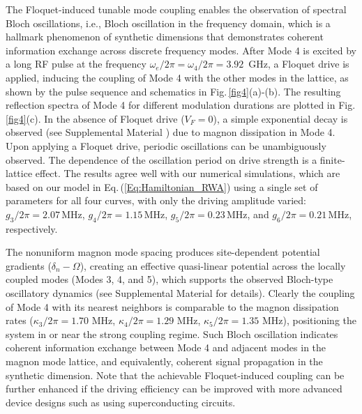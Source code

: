 \documentclass[
twocolumn,

superscriptaddress,









 amsmath,amssymb,
 aps,


prl,




]{revtex4-2}
\begin{document}
The Floquet-induced tunable mode coupling enables the observation of spectral Bloch oscillations, i.e., Bloch oscillation in the frequency domain, which is a hallmark phenomenon of synthetic dimensions that demonstrates coherent information exchange across discrete frequency modes. After Mode 4 is excited by a long RF pulse at the frequency $\omega_e/2\pi=\omega_4/2\pi=3.92$~GHz, a Floquet drive is applied, inducing the coupling of Mode 4 with the other modes in the lattice, as shown by the pulse sequence and schematics in Fig.\,\ref{fig4}(a)-(b). The resulting reflection spectra of Mode 4 for different modulation durations are plotted in Fig.\,\ref{fig4}(c). In the absence of Floquet drive ($V_F = 0$), a simple exponential decay is observed (see Supplemental Material \cite{SM}) due to magnon dissipation in Mode 4. Upon applying a Floquet drive, periodic oscillations can be unambiguously observed. The dependence of the oscillation period on drive strength is a finite-lattice effect. The results agree well with our numerical simulations, which are based on our model in Eq.\,(\ref{Eq:Hamiltonian_RWA}) using a single set of parameters for all four curves, with only the driving amplitude varied: $g_3/2\pi = 2.07$\,MHz, $g_4/2\pi = 1.15$\,MHz, $g_5/2\pi = 0.23$\,MHz, and $g_6/2\pi = 0.21$\,MHz, respectively.

The nonuniform magnon mode spacing produces site-dependent potential gradients ($\delta_n - \Omega$), creating an effective quasi-linear potential across the locally coupled modes (Modes 3, 4, and 5), which supports the observed Bloch-type oscillatory dynamics (see Supplemental Material \cite{SM} for details). Clearly the coupling of Mode 4 with its nearest neighbors is comparable to the magnon dissipation rates ($\kappa_3/2\pi=1.70$ MHz, $\kappa_4/2\pi=1.29$ MHz, $\kappa_5/2\pi=1.35$ MHz), positioning the system in or near the strong coupling regime. Such Bloch oscillation indicates coherent information exchange between Mode 4 and adjacent modes in the magnon mode lattice, and equivalently, coherent signal propagation in the synthetic dimension. Note that the achievable Floquet-induced coupling can be further enhanced if the driving efficiency can be improved with more advanced device designs such as using superconducting circuits.
\end{document}
